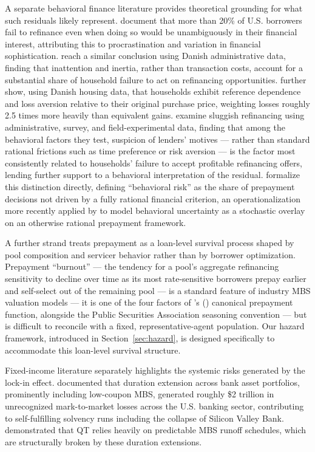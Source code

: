 \documentclass[12pt]{article}
\newcommand{\citepos}[1]{\citeauthor{#1}'s (\citeyear{#1})}
\begin{document}
A separate behavioral finance literature provides theoretical grounding for what such residuals likely represent. \citet{keys2016} document that more than 20\% of U.S. borrowers fail to refinance even when doing so would be unambiguously in their financial interest, attributing this to procrastination and variation in financial sophistication. \citet{andersen2020} reach a similar conclusion using Danish administrative data, finding that inattention and inertia, rather than transaction costs, account for a substantial share of household failure to act on refinancing opportunities. \citet{andersen2022} further show, using Danish housing data, that households exhibit reference dependence and loss aversion relative to their original purchase price, weighting losses roughly 2.5 times more heavily than equivalent gains. \citet{johnson2019} examine sluggish refinancing using administrative, survey, and field-experimental data, finding that among the behavioral factors they test, suspicion of lenders' motives --- rather than standard rational frictions such as time preference or risk aversion --- is the factor most consistently related to households' failure to accept profitable refinancing offers, lending further support to a behavioral interpretation of the residual. \citet{bissiri2014} formalize this distinction directly, defining ``behavioral risk'' as the share of prepayment decisions not driven by a fully rational financial criterion, an operationalization more recently applied by \citet{perotti2024} to model behavioral uncertainty as a stochastic overlay on an otherwise rational prepayment framework.

A further strand treats prepayment as a loan-level survival process shaped by pool composition and servicer behavior rather than by borrower optimization. Prepayment ``burnout'' --- the tendency for a pool's aggregate refinancing sensitivity to decline over time as its most rate-sensitive borrowers prepay earlier and self-select out of the remaining pool --- is a standard feature of industry MBS valuation models --- it is one of the four factors of \citepos{richard1989} canonical prepayment function, alongside the Public Securities Association seasoning convention --- but is difficult to reconcile with a fixed, representative-agent population. Our hazard framework, introduced in Section~\ref{sec:hazard}, is designed specifically to accommodate this loan-level survival structure.

Fixed-income literature separately highlights the systemic risks generated by the lock-in effect. \citet{jiang2023} documented that duration extension across bank asset portfolios, prominently including low-coupon MBS, generated roughly \$2 trillion in unrecognized mark-to-market losses across the U.S. banking sector, contributing to self-fulfilling solvency runs including the collapse of Silicon Valley Bank. \citet{smith2023} demonstrated that QT relies heavily on predictable MBS runoff schedules, which are structurally broken by these duration extensions.
\end{document}
